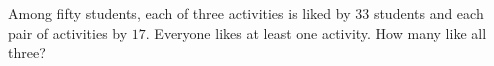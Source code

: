 Among fifty students, each of three activities is liked by $33$ students and each pair of activities by $17$. Everyone likes at least one activity. How many like all three?
